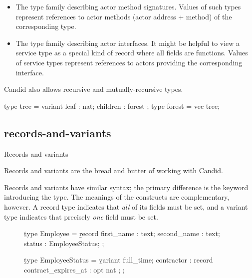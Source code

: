 \documentclass{article}
\begin{document}
\begin{itemize}
    \item
    The \href{https://internetcomputer.org/docs/current/references/candid-ref#type-func---}{} type family describing actor method signatures.
    Values of such types represent references to actor methods (actor address + method) of the corresponding type.
    \item
    The \href{https://internetcomputer.org/docs/current/references/candid-ref#type-service-}{} type family describing actor interfaces.
    It might be helpful to view a service type as a special kind of record where all fields are functions.
    Values of service types represent references to actors providing the corresponding interface.
\end{itemize}

Candid also allows recursive and mutually-recursive types.

\begin{code}[good]
type tree = variant { leaf : nat; children : forest };
type forest = vec tree;
\end{code}

\subsection{records-and-variants}{Records and variants}

Records and variants are the bread and butter of working with Candid.

Records and variants have similar syntax; the primary difference is the keyword introducing the type.
The meanings of the constructs are complementary, however.
A record type indicates that \emph{all} of its fields must be set, and a variant type indicates that precisely \emph{one} field must be set.

\begin{figure}

\begin{code}[candid]
\b{type} Employee = \b{record} {
  first_name : text;
  second_name : text;
  status : EmployeeStatus;
};

\b{type} EmployeeStatus = \b{variant} {
  full_time;
  contractor : record { contract_expires_at : opt nat };
};
\end{code}
\end{figure}
\end{document}

